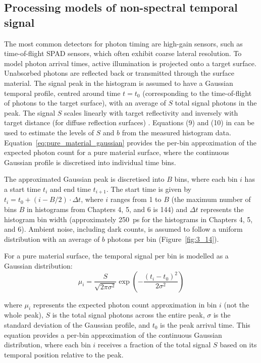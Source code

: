 \documentclass[12pt,a4paper,oneside]{report}
\begin{document}
\subsection{Processing models of non-spectral temporal signal}
\label{subsec:processing_models_non-spectral_temporal}

The most common detectors for photon timing are high-gain sensors, such as time-of-flight SPAD sensors, which often exhibit coarse lateral resolution. To model photon arrival times, active illumination is projected onto a target surface. Unabsorbed photons are reflected back or transmitted through the surface material. The signal peak in the histogram is assumed to have a Gaussian temporal profile, centred around time $t = t_0$ (corresponding to the time-of-flight of photons to the target surface), with an average of $S$ total signal photons in the peak. The signal $S$ scales linearly with target reflectivity and inversely with target distance (for diffuse reflection surfaces) \cite{tontini2020}. Equations (9) and (10) in \cite{tontini2020} can be used to estimate the levels of $S$ and $b$ from the measured histogram data. Equation~\ref{eq:pure_material_gaussian} provides the per-bin approximation of the expected photon count for a pure material surface, where the continuous Gaussian profile is discretised into individual time bins.

The approximated Gaussian peak is discretised into $B$ bins, where each bin $i$ has a start time $t_i$ and end time $t_{i+1}$. The start time is given by $t_i = t_0 + (i - B/2) \cdot \Delta t$, where $i$ ranges from 1 to $B$ (the maximum number of bins $B$ in histograms from Chapters 4, 5, and 6 is 144) and $\Delta t$ represents the histogram bin width (approximately 250~ps for the histograms in Chapters 4, 5, and 6). Ambient noise, including dark counts, is assumed to follow a uniform distribution with an average of $b$ photons per bin (Figure~\ref{fig:3_14}).

For a pure material surface, the temporal signal per bin is modelled as a Gaussian distribution:
\begin{equation}
\mu_i = \frac{S}{\sqrt{2\pi\sigma^2}} \exp\left(-\frac{(t_i - t_0)^2}{2\sigma^2}\right)
\label{eq:pure_material_gaussian}
\end{equation}

where $\mu_i$ represents the expected photon count approximation in bin $i$ (not the whole peak), $S$ is the total signal photons across the entire peak, $\sigma$ is the standard deviation of the Gaussian profile, and $t_0$ is the peak arrival time. This equation provides a per-bin approximation of the continuous Gaussian distribution, where each bin $i$ receives a fraction of the total signal $S$ based on its temporal position relative to the peak.
\end{document}
